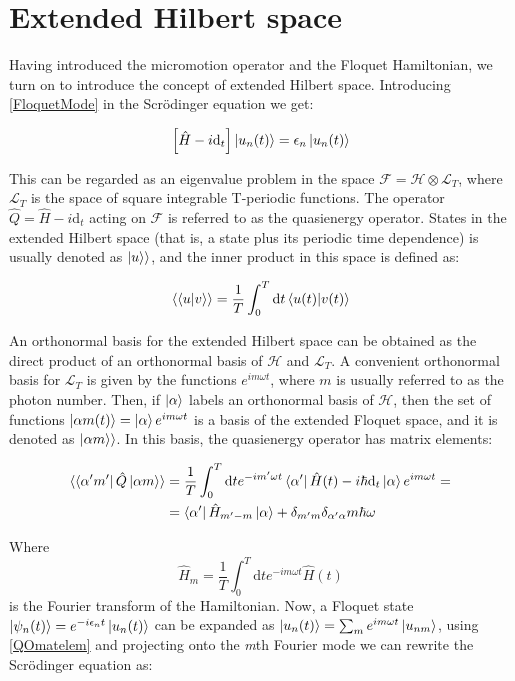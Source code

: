 \section{Extended Hilbert space}

Having introduced the micromotion operator and the Floquet Hamiltonian, we turn on to introduce the concept of extended Hilbert space. Introducing \ref{FloquetMode} in the Scr\"{o}dinger equation we get:

\begin{equation}
\left[ \hat{H}-i\text{d}_t\right] \ket{u_n(t)} = \epsilon_n\ket{u_n(t)}
\end{equation}

This can be regarded as an eigenvalue problem in the space $\mathcal{F}=\mathcal{H}\otimes\mathcal{L}_T$, where $\mathcal{L}_T$ is the space of square integrable T-periodic functions. The operator $\hat{Q} = \hat{H}-i\text{d}_t$ acting on $\mathcal{F}$ is referred to as the quasienergy operator. States in the extended Hilbert space (that is, a state plus its periodic time dependence) is usually denoted as $\ket{u}\rangle$, and the inner product in this space is defined as:

\begin{equation}
\langle \bra{u}\ket{v} \rangle = \frac{1}{T}\int_0^T \text{d}t \bra{u(t)}\ket{v(t)}
\end{equation}

An orthonormal basis for the extended Hilbert space can be obtained as the direct product of an orthonormal basis of $\mathcal{H}$ and $\mathcal{L}_T$. A convenient orthonormal basis for $\mathcal{L}_T$ is given by the functions $e^{im\omega t}$, where $m$ is usually referred to as the photon number. Then, if $\ket{\alpha}$ labels an orthonormal basis of $\mathcal{H}$, then the set of functions $\ket{\alpha m (t)} = \ket{\alpha}e^{im\omega t}$ is a basis of the extended Floquet space, and it is denoted as $\ket{\alpha m}\rangle$. In this basis, the quasienergy operator has matrix elements:

\begin{align}
\langle \bra{\alpha' m'}\hat{Q}\ket{\alpha m} \rangle &= \frac{1}{T}\int_0^T \text{d}t e^{-im'\omega t}\bra{\alpha'} \hat{H}(t)-i\hbar\text{d}_t \ket{\alpha}e^{im\omega t} = \nonumber \\
&= \bra{\alpha'} \hat{H}_{m'-m} \ket{\alpha} + \delta_{m'm}\delta_{\alpha' \alpha}m\hbar\omega \label{QOmatelem}
\end{align}

Where
\begin{equation}
\hat{H}_m = \frac{1}{T}\int_0^T \text{d}t e^{-im\omega t}\hat{H}(t) 
\end{equation}
is the Fourier transform of the Hamiltonian. Now, a Floquet state $\ket{\psi_n(t)} = e^{-i \epsilon_n t}\ket{u_n(t)}$ can be expanded as $\ket{u_n(t)} = \sum_m e^{im\omega t}\ket{u_{nm}}$, using \ref{QOmatelem} and projecting onto the \textit{m}th Fourier mode we can rewrite the Scr\"{o}dinger equation as:

